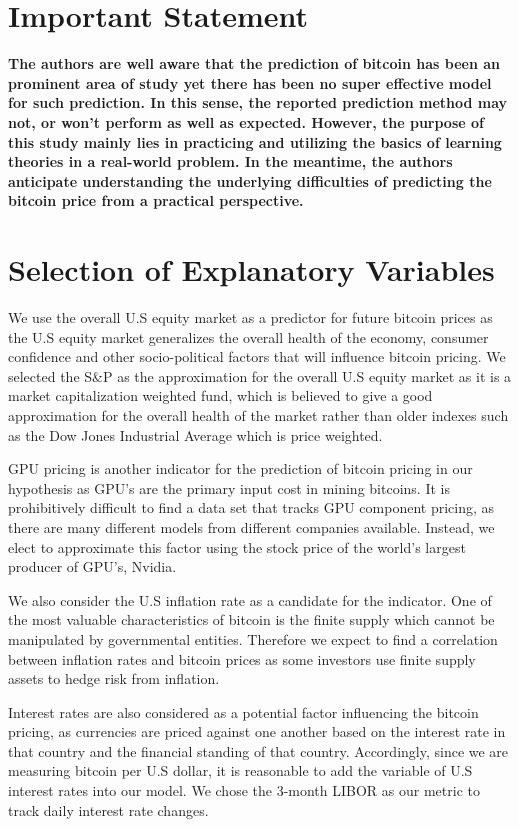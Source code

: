 \documentclass[9pt,twocolumn,twoside]{ilcss}
\begin{document}
\section*{Important Statement}
\textbf{The authors are well aware that the prediction of bitcoin has been an prominent area of study yet there has been no super effective model for such prediction. In this sense, the reported prediction method may not, or won't perform as well as expected. However, the purpose of this study mainly lies in practicing and utilizing the basics of learning theories in a real-world problem. In the meantime, the authors anticipate understanding the underlying difficulties of predicting the bitcoin price from a practical perspective.}

\section{Selection of Explanatory Variables}
We use the overall U.S equity market as a predictor for future bitcoin prices as the U.S equity market generalizes the overall health of the economy, consumer confidence and other socio-political factors that will influence bitcoin pricing. We selected the S\&P as the approximation for the overall U.S equity market as it is a market capitalization weighted fund, which is believed to give a good approximation for the overall health of the market rather than older indexes such as the Dow Jones Industrial Average which is price weighted.  

GPU pricing is another indicator for the prediction of bitcoin pricing in our hypothesis as GPU’s are the primary input cost in mining bitcoins. It is prohibitively difficult to find a data set that tracks GPU component pricing, as there are many different models from different companies available. Instead, we elect to approximate this factor using the stock price of the world’s largest producer of GPU’s, Nvidia.

We also consider the U.S inflation rate as a candidate for the indicator. One of the most valuable characteristics of bitcoin is the finite supply which cannot be manipulated by governmental entities. Therefore we expect to find a correlation between inflation rates and bitcoin prices as some investors use finite supply assets to hedge risk from inflation.

Interest rates are also considered as a potential factor influencing the bitcoin pricing, as currencies are priced against one another based on the interest rate in that country and the financial standing of that country. Accordingly, since we are measuring bitcoin per U.S dollar, it is reasonable to add the variable of U.S interest rates into our model. We chose the 3-month LIBOR as our metric to track daily interest rate changes.
\end{document}
